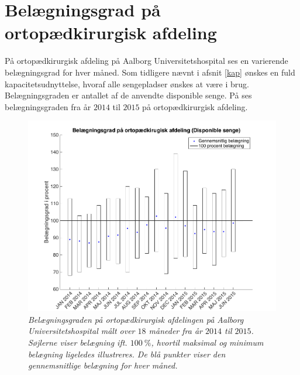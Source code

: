 \section{Belægningsgrad på ortopædkirurgisk afdeling} \label{omfang}
På ortopædkirurgisk afdeling på Aalborg Universitetshospital ses en varierende belægningsgrad for hver måned. Som tidligere nævnt i afsnit \ref{kap} ønskes en fuld kapacitetsudnyttelse, hvoraf alle sengepladser ønskes at være i brug. Belægningsgraden er antallet af de anvendte disponible senge. På  ses belægningsgraden fra år $2014$ til $2015$ på ortopædkirurgisk afdeling.\cite{SDS2015}


\begin{figure}[H]
	\flushleft 
	\centering
	\includegraphics[scale=.45]{figures/maxminoverbelaeg.png}
	\flushleft
	\caption{\textit{Belægningsgraden på ortopædkirurgisk afdelingen på Aalborg Universitetshospital målt over $18$ måneder fra år $2014$ til $2015$. Søjlerne viser belægning ift. $100~\%$, hvortil maksimal og minimum belægning ligeledes illustreres. De blå punkter viser den gennemsnitlige belægning for hver måned.}\cite{SDS2015}}
	\label{maxminbelaeg}
\end{figure}

